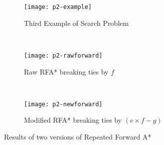 \begin{figure}[t]
  \centering
  \begin{subfigure}[b]{0.35\textwidth}
    \texttt{[image: p2-example]}
    \caption{Third Example of Search Problem}
    \label{fig:p2-example}
  \end{subfigure}
  ~
  \begin{subfigure}[b]{0.30\textwidth}
    \texttt{[image: p2-rawforward]}
    \caption{Raw RFA* breaking ties by $f$}
    \label{fig:rawforward}
  \end{subfigure}
  ~
  \begin{subfigure}[b]{0.30\textwidth}
    \texttt{[image: p2-newforward]}
    \caption{Modified RFA* breaking ties by $(c\times f-g)$}
    \label{fig:newforward}
  \end{subfigure}
\caption{Results of two versions of Repeated Forward A*}
\end{figure}


